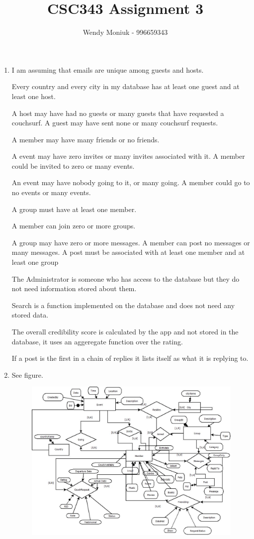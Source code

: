 \documentclass[10pt,a4paper]{article}
\author{Wendy Moniuk - 996659343}
\title{CSC343 Assignment 3}
\begin{document}
\maketitle
\begin{enumerate}

\item I am assuming that emails are unique among guests and hosts.

Every country and every city in my database has at least one guest and at least one host.

A host may have had no guests or many guests that have requested a couchsurf. A guest may have sent none or many couchsurf requests.

A member may have many friends or no friends.

A event may have zero invites or many invites associated with it. A member could be invited to zero or many events.

An event may have nobody going to it, or many going. A member could go to no events or many events.

A group must have at least one member.

A member can join zero or more groups.

A group may have zero or more messages. A member can post no messages or many messages. A post must be associated with at least one member and at least one group

The Administrator is someone who has access to the database but they do not need information stored about them.

Search is a function implemented on the database and does not need any stored data.

The overall credibility score is calculated by the app and not stored in the database, it uses an aggeregate function over the rating.

If a post is the first in a chain of replies it lists itself as what it is replying to.


\item See figure.
\begin{figure}
\includegraphics[width=5.5in]{./Diagram1}
\end{figure}


\end{enumerate}
\end{document}
